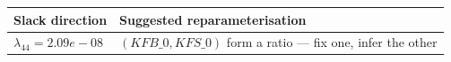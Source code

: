 \begin{tabular}{lp{6cm}}
\toprule
Slack direction & Suggested reparameterisation \\
\midrule
$\lambda_{44} = 2.09e-08$ & $(KFB\_0, KFS\_0)$ form a ratio — fix one, infer the other \\
\bottomrule
\end{tabular}
